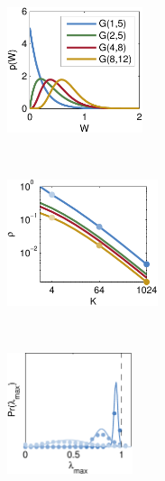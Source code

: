 
\begin{figure}[!ht]
\vspace{-.5em}
\begin{center}
\begin{subfigure}[b]{.23\textwidth}
\caption{}
\label{fig:stability_p_w}
\vspace{-.9em}
\includegraphics[height=1.45in]{figures/ch2/stability_p_w} 
\end{subfigure}
~
\begin{subfigure}[b]{.23\textwidth}
\caption{}
\vspace{-1em}
\label{fig:stability_max_rho}
\includegraphics[height=1.45in]{figures/ch2/stability_max_rho} 
\end{subfigure}
~
\hspace{1em}
\begin{subfigure}[b]{.23\textwidth}
\caption{}
\label{fig:stability_1_5}
\vspace{-.5em}
\includegraphics[height=1.4in]{figures/ch2/stability_1_5} 
\end{subfigure}
~
\begin{subfigure}[b]{.23\textwidth}
\caption{}
\label{fig:stability_8_12}

\end{subfigure}
\end{center}
\end{figure}
